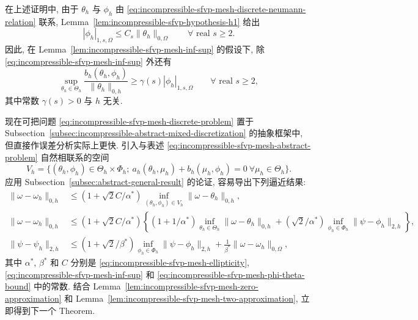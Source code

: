\begin{Remark}\label{rem:incompressible-sfvp-mesh-w1s-inf-sup}
在上述证明中, 由于 $\theta_h$ 与 $\phi_h$
由 \eqref{eq:incompressible-sfvp-mesh-discrete-neumann-relation} 联系,
Lemma~\ref{lem:incompressible-sfvp-hypothesis-h1} 给出
\[
|\phi_h|_{1,s,\Omega}
\leq C_s\|\theta_h\|_{0,\Omega}
\qquad\forall\text{ real }s\geq2.
\]
因此, 在 Lemma~\ref{lem:incompressible-sfvp-mesh-inf-sup}
的假设下, 除 \eqref{eq:incompressible-sfvp-mesh-inf-sup} 外还有
\[
\sup_{\theta_h\in\Theta_h}
\frac{b_h(\theta_h,\phi_h)}{\|\theta_h\|_{0,h}}
\geq\gamma(s)|\phi_h|_{1,s,\Omega}
\qquad\forall\text{ real }s\geq2,
\]
其中常数 $\gamma(s)>0$ 与 $h$ 无关.
\end{Remark}

现在可把问题 \eqref{eq:incompressible-sfvp-mesh-discrete-problem}
置于 Subsection~\ref{subsec:incompressible-abstract-mixed-discretization}
的抽象框架中, 但直接作误差分析实际上更快.
引入与表述 \eqref{eq:incompressible-sfvp-mesh-abstract-problem}
自然相联系的空间
\[
V_h
=\{(\theta_h,\phi_h)\in\Theta_h\times\Phi_h;
\ a_h(\theta_h,\mu_h)+b_h(\mu_h,\phi_h)=0
\ \forall\mu_h\in\Theta_h\}.
\]
应用 Subsection~\ref{subsec:abstract-general-result} 的论证,
容易导出下列逼近结果:
\begin{equation}\label{eq:incompressible-sfvp-mesh-abstract-errors}
\begin{aligned}
\|\omega-\omega_h\|_{0,h}
&\leq(1+\sqrt2C/\alpha^*)
\inf_{(\theta_h,\phi_h)\in V_h}
\|\omega-\theta_h\|_{0,h},\\
\|\omega-\omega_h\|_{0,h}
&\leq(1+\sqrt2C/\alpha^*)
\left\{(1+1/\alpha^*)
\inf_{\theta_h\in\Theta_h}\|\omega-\theta_h\|_{0,h}
+(\sqrt2/\alpha^*)
\inf_{\phi_h\in\Phi_h}\|\psi-\phi_h\|_{2,h}\right\},\\
\|\psi-\psi_h\|_{2,h}
&\leq(1+\sqrt2/\beta^*)
\inf_{\phi_h\in\Phi_h}\|\psi-\phi_h\|_{2,h}
+\frac1{\beta^*}\|\omega-\omega_h\|_{0,\Omega},
\end{aligned}
\end{equation}
其中 $\alpha^*$, $\beta^*$ 和 $C$ 分别是
\eqref{eq:incompressible-sfvp-mesh-ellipticity},
\eqref{eq:incompressible-sfvp-mesh-inf-sup}
和 \eqref{eq:incompressible-sfvp-mesh-phi-theta-bound} 中的常数.
结合 Lemma~\ref{lem:incompressible-sfvp-mesh-zero-approximation}
和 Lemma~\ref{lem:incompressible-sfvp-mesh-two-approximation},
立即得到下一个 Theorem.

